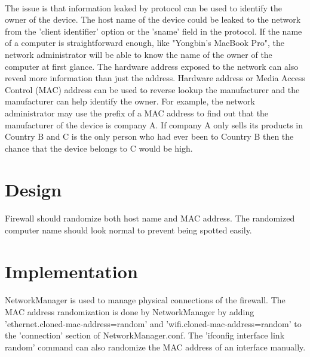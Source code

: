 \documentclass[mscthesis]{usiinfthesis}
\begin{document}
\paragraph{}
The issue is that information leaked by protocol can be used to identify the owner of the device. The host name of the device could be leaked to the network from the 'client identifier' option or the 'sname' field in the protocol.\citep{rfc:dhcp} If the name of a computer is straightforward enough, like "Yongbin's MacBook Pro", the network administrator will be able to know the name of the owner of the computer at first glance. The hardware address exposed to the network can also reveal more information than just the address. Hardware address or Media Access Control (MAC) address can be used to reverse lookup the manufacturer and the manufacturer can help identify the owner. For example, the network administrator may use the prefix of a MAC address to find out that the manufacturer of the device is company A. If company A only sells its products in Country B and C is the only person who had ever been to Country B then the chance that the device belongs to C would be high.

\section{Design}
\paragraph{}
Firewall should randomize both host name and MAC address. The randomized computer name should look normal to prevent being spotted easily.


\section{Implementation}
\paragraph{}
NetworkManager is used to manage physical connections of the firewall. The MAC address randomization is done by NetworkManager by adding 'ethernet.cloned-mac-address=random' and 'wifi.cloned-mac-address=random' to the 'connection' section of NetworkManager.conf. The 'ifconfig interface link random' command can also randomize the MAC address of an interface manually.
\end{document}
